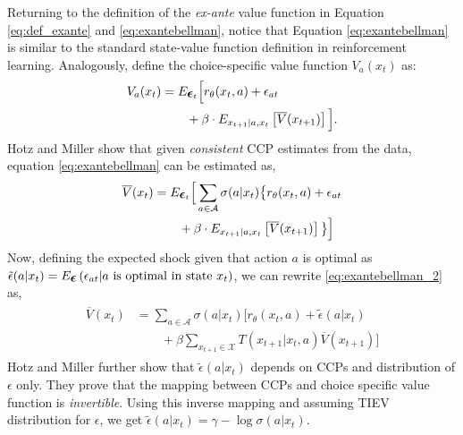 \documentclass{article}
\renewcommand{\vec}[1]{\mbox{\bm{$#1$}}}
\begin{document}
Returning to the definition of the \emph{ex-ante} value function in Equation \eqref{eq:def_exante} and \eqref{eq:exantebellman}, notice that Equation \eqref{eq:exantebellman} is similar to the standard state-value function definition in reinforcement learning. Analogously, define the choice-specific value function $V_a(x_t)$  as:
\begin{align}
\begin{split}
V_a(x_t) &= E_{\vec{\epsilon}_t}\Big[r_{\theta}(x_t,a)+\epsilon_{at} \\
& \qquad +\beta  \cdot E_{x_{t+1}|a,x_t} \left[ \overline{V}(x_{t+1}) \right] \Big].\\
\end{split}
\end{align}
Hotz and Miller  show that given \textit{consistent} CCP estimates from the data, equation \eqref{eq:exantebellman} can be estimated as,
\begin{align} \label{eq:exantebellman_2}
\begin{split}
\overline{V}(x_t) & = E_{\vec{\epsilon}_t}\Big[\sum_{a\in\mathcal{A}} \sigma(a|x_t) \big\{r_{\theta}(x_t,a)+\epsilon_{at} \\
& \qquad +\beta  \cdot E_{x_{t+1}|a,x_t} \left[ \overline{V}(x_{t+1}) \right] \big\}\Big]\\
\end{split}
\end{align}
Now, defining the expected shock given that action $a$ is optimal as $\tilde{\epsilon}(a|x_t) = E_{\vec{\epsilon}}\left( \epsilon_{at} |a\ \textrm{is optimal in state } x_t\right)$, we can rewrite \eqref{eq:exantebellman_2} as,
\begin{align} \label{eq:exantebellman_3}
\begin{split}
\overline{V}(x_t) & = \sum_{a\in\mathcal{A}} \sigma(a|x_t) \Big[r_{\theta}(x_t,a)+\tilde{\epsilon}(a|x_t) \\
& \qquad +\beta \sum_{x_{t+1}\in\mathcal{X}} T(x_{t+1}|x_t,a) \overline{V}(x_{t+1})\Big]
\end{split}
\end{align}
Hotz and Miller  further show that $\tilde{\epsilon}(a|x_t)$ depends on CCPs and distribution of $\epsilon$ only. They prove that the mapping between CCPs and choice specific value function is \emph{invertible}. Using this inverse mapping and assuming TIEV distribution for $\epsilon$, we get $\tilde{\epsilon}(a|x_t) = \gamma - \log \sigma(a|x_t)$.
\end{document}
